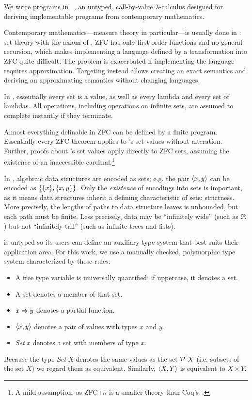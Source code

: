 \documentclass{llncs}
\begin{document}
We write programs in \lzfclang~\cite{cit:toronto-2012flops-lzfc}, an untyped, call-by-value $\lambda$-calculus designed for deriving implementable programs from contemporary mathematics.

Contemporary mathematics---measure theory in particular---is usually done in :  set theory with the axiom of .
ZFC has only first-order functions and no general recursion, which makes implementing a language defined by a transformation into ZFC quite difficult.
The problem is exacerbated if implementing the language requires approximation.
Targeting \lzfclang instead allows creating an exact semantics and deriving an approximating semantics without changing languages.

In \lzfclang, essentially every set is a value, as well as every lambda and every set of lambdas.
All operations, including operations on infinite sets, are assumed to complete instantly if they terminate.

Almost everything definable in ZFC can be defined by a finite \lzfclang program.
Essentially every ZFC theorem applies to \lzfclang's set values without alteration.
Further, proofs about \lzfclang's set values apply directly to ZFC sets, assuming the existence of an inaccessible cardinal.\footnote{A mild assumption, as ZFC+$\kappa$ is a smaller theory than Coq's~\cite{cit:barras-2010-sets-coq}.}

In \lzfclang, algebraic data structures are encoded as sets; e.g. the pair $\langle{x,y}\rangle$ can be encoded as $\{{\{{x}\},\{{x,y}\}}\}$.
Only the \emph{existence} of encodings into sets is important, as it means data structures inherit a defining characteristic of sets: strictness.
More precisely, the lengths of paths to data structure leaves is unbounded, but each path must be finite.
Less precisely, data may be ``infinitely wide'' (such as $\Re$) but not ``infinitely tall'' (such as infinite trees and lists).


\lzfclang is untyped so its users can define an auxiliary type system that best suits their application area.
For this work, we use a manually checked, polymorphic type system characterized by these rules:
\begin{itemize}
	\item A free type variable is universally quantified; if uppercase, it denotes a set.
	\item A set denotes a member of that set.
	\item $x \Rightarrow y$ denotes a partial function.
	\item $\langle{x,y}\rangle$ denotes a pair of values with types $x$ and $y$.
	\item $Set~x$ denotes a set with members of type $x$.
\end{itemize}
Because the type $Set~X$ denotes the same values as the set $\mathcal{P}~X$ (i.e. subsets of the set $X$) we regard them as equivalent.
Similarly, $\langle{X,Y}\rangle$ is equivalent to $X \times Y$.
\end{document}

